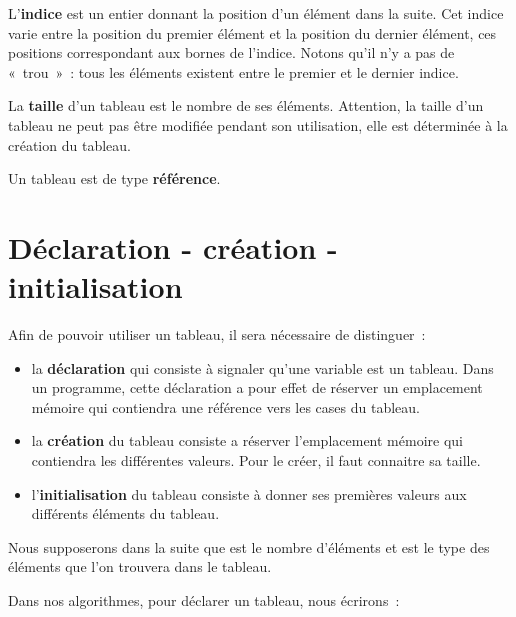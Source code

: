 		L’\textbf{indice} est un entier
		donnant la position d’un élément dans la suite. 
		Cet indice varie entre la position du premier élément 
		et la position du dernier élément, 
		ces positions correspondant aux bornes de l’indice.
		Notons qu’il n’y a pas de «~trou~»~: 
		tous les éléments existent entre le premier et le dernier indice.
	
		La \textbf{taille} d’un tableau est le nombre de
		ses éléments.  Attention, la taille d’un tableau ne peut pas être
		modifiée pendant son utilisation, elle est déterminée à la création du
		tableau.

		Un tableau est de type \textbf{référence}.
	
	\section{Déclaration - création - initialisation}

		Afin de pouvoir utiliser un tableau, il sera nécessaire de distinguer~:
		\begin{itemize}

			\item la \textbf{déclaration} qui consiste à signaler qu'une
				variable est un tableau. Dans un programme, cette déclaration
				a pour effet de réserver un emplacement mémoire qui contiendra
				une référence vers les cases du tableau. 

			\item la \textbf{création} du tableau consiste a réserver
				l'emplacement mémoire qui contiendra les différentes valeurs.
				Pour le créer, il faut connaitre sa taille. 

			\item l'\textbf{initialisation} du tableau consiste à donner ses
				premières valeurs aux différents éléments du tableau.
		
		\end{itemize}


		Nous supposerons dans la suite que  est le nombre d’éléments 
		et  est le type des éléments que l’on trouvera dans le tableau.  
		
		Dans nos algorithmes, pour déclarer un tableau, nous écrirons~:

		\begin{pseudocode}
			\Empty
		\end{pseudocode}
		
